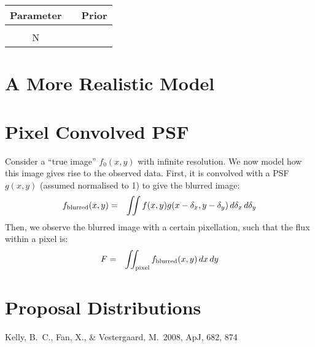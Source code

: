 \documentclass[letterpaper, 11pt]{article}
\begin{document}
\begin{table}
\begin{tabular}{ccc}
Parameter & \vline & Prior \\
\hline \\
N & & \\
\end{tabular}
\end{table}

\section{A More Realistic Model}
\citep{2008ApJ...682..874K}

\appendix
\section{Pixel Convolved PSF}
Consider a ``true image'' $f_0(x, y)$ with infinite resolution. We now model how
this image
gives rise to the observed data. First, it is convolved with a
PSF $g(x,y)$ (assumed normalised to 1) to give the blurred image:
\begin{eqnarray}
f_{\rm{blurred}}(x,y) &=& \iint f(x, y)g(x - \delta_x, y - \delta_y)
\, d\delta_x \, d\delta_y
\end{eqnarray}
Then, we observe the blurred image with a certain pixellation, such that
the flux within a pixel is:
\begin{eqnarray}
F &=& \iint_{\rm{pixel}} f_{\rm blurred}(x, y) \,dx\,dy
\end{eqnarray}



\section{Proposal Distributions}



\begin{thebibliography}{99}
 Kelly, B.~C., Fan, X., 
\& Vestergaard, M.\ 2008, ApJ, 682, 874 
\end{thebibliography}
\end{document}
